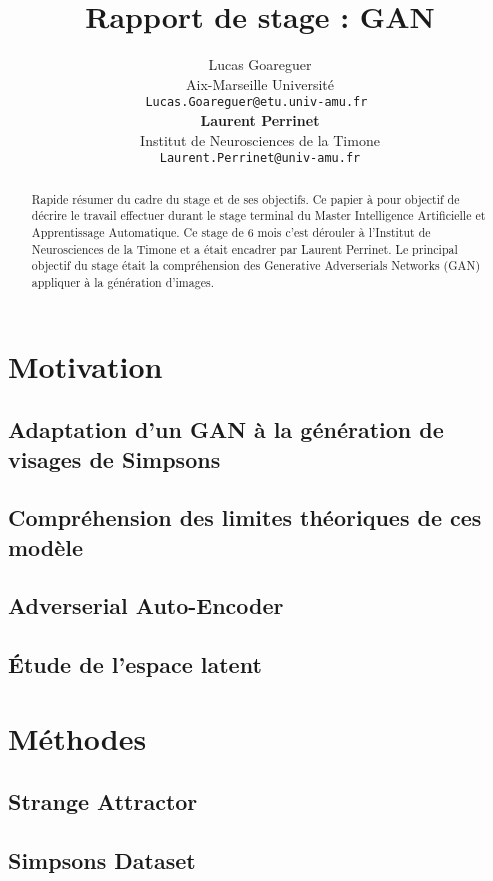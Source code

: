 \documentclass[11pt]{article}
\title{Rapport de stage : GAN}
\author{Lucas Goareguer \\
  Aix-Marseille Université \\
  \texttt{Lucas.Goareguer@etu.univ-amu.fr   } \\\And
   {\bf Laurent Perrinet} \\
  Institut de Neurosciences de la Timone \\
  {\tt Laurent.Perrinet@univ-amu.fr} \\}
\date{}
\begin{document}
\maketitle
\begin{abstract}
Rapide résumer du cadre du stage et de ses objectifs.
Ce papier à pour objectif de décrire le travail effectuer durant le stage terminal du Master Intelligence Artificielle et Apprentissage Automatique.
Ce stage de 6 mois c'est dérouler à l'Institut de Neurosciences de la Timone et a était encadrer par Laurent Perrinet.
Le principal objectif du stage était la compréhension des Generative Adverserials Networks (GAN) appliquer à la génération d'images.
\end{abstract}


\section{Motivation}

\subsection{Adaptation d'un GAN à la génération de visages de Simpsons}
\subsection{Compréhension des limites théoriques de ces modèle}
\subsection{Adverserial Auto-Encoder}
\subsection{Étude de l'espace latent}

\section{Méthodes}

\subsection{Strange Attractor}
\subsection{Simpsons Dataset}
\end{document}
